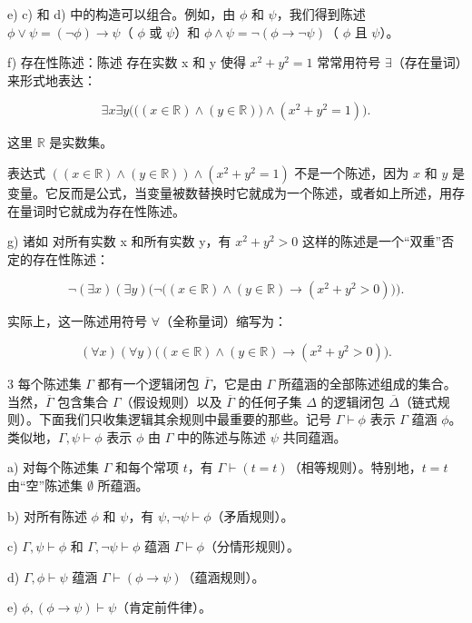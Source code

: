 e) c) 和 d) 中的构造可以组合。例如，由  $ \phi $ 和  $ \psi $，我们得到陈述  $ \phi \lor \psi = (\neg \phi) \rightarrow \psi $（ $ \phi $ 或  $ \psi $）和  $ \phi \land \psi = \neg (\phi \rightarrow \neg \psi) $（ $ \phi $ 且  $ \psi $）。

f) 存在性陈述：陈述 存在实数 x 和 y 使得  $ x^{2} + y^{2} = 1 $ 常常用符号  $ \exists $（存在量词）来形式地表达：

\[
\exists x\exists y\Big(\big((x\in\mathbb{R})\land(y\in\mathbb{R})\big)\land(x^{2}+y^{2}=1)\Big).
\]

这里  $ \mathbb{R} $ 是实数集。

表达式  $ ((x \in \mathbb{R}) \land (y \in \mathbb{R})) \land (x^2 + y^2 = 1) $ 不是一个陈述，因为  $ x $ 和  $ y $ 是变量。它反而是公式，当变量被数替换时它就成为一个陈述，或者如上所述，用存在量词时它就成为存在性陈述。

g) 诸如 对所有实数 x 和所有实数 y，有  $ x^{2} + y^{2} > 0 $ 这样的陈述是一个“双重”否定的存在性陈述：

\[
\neg(\exists x)(\exists y)\Big(\neg\big((x\in\mathbb{R})\land(y\in\mathbb{R})\to(x^{2}+y^{2}>0)\big)\Big).
\]

实际上，这一陈述用符号  $ \forall $（全称量词）缩写为：

\[
(\forall x)(\forall y)\big((x\in\mathbb{R})\land(y\in\mathbb{R})\to(x^{2}+y^{2}>0)\big).
\]

3 每个陈述集 $\Gamma$ 都有一个逻辑闭包 $\overline{\Gamma}$，它是由 $\Gamma$ 所蕴涵的全部陈述组成的集合。当然，$\overline{\Gamma}$ 包含集合 $\Gamma$（假设规则）以及 $\overline{\Gamma}$ 的任何子集 $\Delta$ 的逻辑闭包 $\overline{\Delta}$（链式规则）。下面我们只收集逻辑其余规则中最重要的那些。记号 $\Gamma \vdash \phi$ 表示 $\Gamma$ 蕴涵 $\phi$。类似地，$\Gamma, \psi \vdash \phi$ 表示 $\phi$ 由 $\Gamma$ 中的陈述与陈述 $\psi$ 共同蕴涵。

a) 对每个陈述集  $ \Gamma $ 和每个常项  $ t $，有  $ \Gamma \vdash (t = t) $（相等规则）。特别地，$ t = t $ 由“空”陈述集  $ \emptyset $ 所蕴涵。

b) 对所有陈述  $ \phi $ 和  $ \psi $，有  $ \psi, \neg\psi \vdash \phi $（矛盾规则）。

c)  $ \Gamma, \psi \vdash \phi $ 和  $ \Gamma, \neg \psi \vdash \phi $ 蕴涵  $ \Gamma \vdash \phi $（分情形规则）。

d)  $ \Gamma, \phi \vdash \psi $ 蕴涵  $ \Gamma \vdash (\phi \to \psi) $（蕴涵规则）。

e)  $ \phi, (\phi \to \psi) \vdash \psi $（肯定前件律）。


